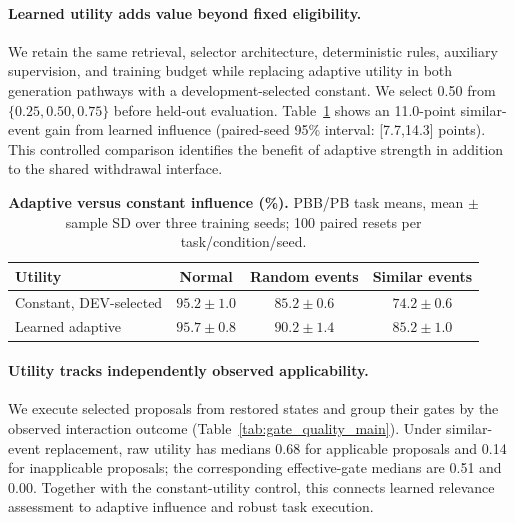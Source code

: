 \paragraph{Learned utility adds value beyond fixed eligibility.}
We retain the same retrieval, selector architecture, deterministic rules, auxiliary supervision, and training budget while replacing adaptive utility in both generation pathways with a development-selected constant.
We select 0.50 from $\{0.25,0.50,0.75\}$ before held-out evaluation. Table~\ref{tab:adaptive_utility_main} shows an 11.0-point similar-event gain from learned influence (paired-seed 95\% interval: [7.7,14.3] points).
This controlled comparison identifies the benefit of adaptive strength in addition to the shared withdrawal interface.

\begin{table}[H]
\centering\small
\caption{\textbf{Adaptive versus constant influence (\%).} PBB/PB task means, mean $\pm$ sample SD over three training seeds; 100 paired resets per task/condition/seed.}
\label{tab:adaptive_utility_main}
\begin{tabularx}{\linewidth}{@{}Xccc@{}}\toprule
Utility & Normal & Random events & Similar events\\\midrule
Constant, DEV-selected & $95.2\pm1.0$ & $85.2\pm0.6$ & $74.2\pm0.6$\\
Learned adaptive & $95.7\pm0.8$ & $90.2\pm1.4$ & $85.2\pm1.0$\\\bottomrule
\end{tabularx}
\end{table}

\paragraph{Utility tracks independently observed applicability.}
We execute selected proposals from restored states and group their gates by the observed interaction outcome (Table~\ref{tab:gate_quality_main}).
Under similar-event replacement, raw utility has medians 0.68 for applicable proposals and 0.14 for inapplicable proposals; the corresponding effective-gate medians are 0.51 and 0.00.
Together with the constant-utility control, this connects learned relevance assessment to adaptive influence and robust task execution.

